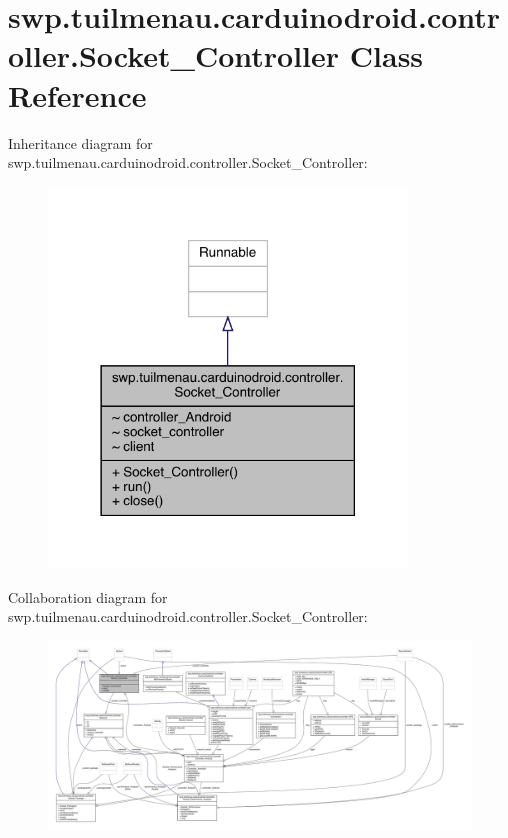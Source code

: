 \hypertarget{classswp_1_1tuilmenau_1_1carduinodroid_1_1controller_1_1_socket___controller}{}\section{swp.\+tuilmenau.\+carduinodroid.\+controller.\+Socket\+\_\+\+Controller Class Reference}
\label{classswp_1_1tuilmenau_1_1carduinodroid_1_1controller_1_1_socket___controller}


Inheritance diagram for swp.\+tuilmenau.\+carduinodroid.\+controller.\+Socket\+\_\+\+Controller\+:
\nopagebreak
\begin{figure}[H]
\begin{center}
\leavevmode
\includegraphics[width=270pt]{classswp_1_1tuilmenau_1_1carduinodroid_1_1controller_1_1_socket___controller__inherit__graph}
\end{center}
\end{figure}


Collaboration diagram for swp.\+tuilmenau.\+carduinodroid.\+controller.\+Socket\+\_\+\+Controller\+:
\nopagebreak
\begin{figure}[H]
\begin{center}
\leavevmode
\includegraphics[width=350pt]{classswp_1_1tuilmenau_1_1carduinodroid_1_1controller_1_1_socket___controller__coll__graph}
\end{center}
\end{figure}
